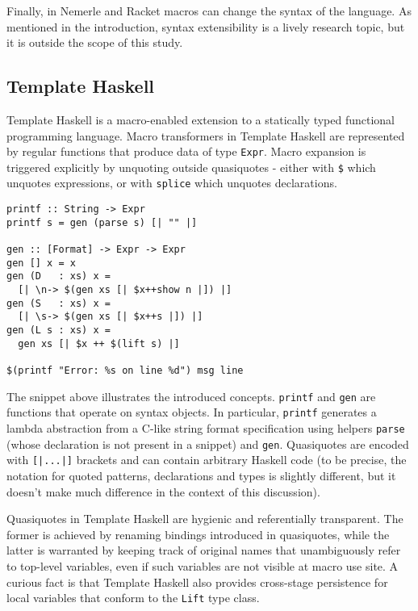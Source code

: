 \documentclass[10pt,journal,a4paper]{IEEEtran}
\begin{document}
Finally, in Nemerle and Racket macros can change the syntax of the language.
As mentioned in the introduction, syntax extensibility is a lively
research topic, but it is outside the scope of this study.

\subsection{Template Haskell}

Template Haskell is a macro-enabled extension to a statically typed functional programming language.
Macro transformers in Template Haskell are represented by regular functions that produce
data of type \small \texttt{Expr}\normalsize. Macro expansion is triggered explicitly by
unquoting outside quasiquotes - either with \small \texttt{\$} \normalsize which unquotes expressions,
or with \small \texttt{splice} \normalsize which unquotes declarations.

\small
\begin{verbatim}
printf :: String -> Expr
printf s = gen (parse s) [| "" |]

gen :: [Format] -> Expr -> Expr
gen [] x = x
gen (D   : xs) x =
  [| \n-> $(gen xs [| $x++show n |]) |]
gen (S   : xs) x =
  [| \s-> $(gen xs [| $x++s |]) |]
gen (L s : xs) x =
  gen xs [| $x ++ $(lift s) |]

$(printf "Error: %s on line %d") msg line
\end{verbatim}
\normalsize

The snippet above illustrates the introduced concepts. \small \texttt{printf} \normalsize and
\small \texttt{gen} \normalsize are functions that operate on syntax objects. In particular,
\small \texttt{printf} \normalsize generates a lambda abstraction from a C-like string format
specification using helpers \small \texttt{parse} \normalsize (whose declaration is
not present in a snippet) and \small \texttt{gen}\normalsize.
Quasiquotes are encoded with \small \texttt{[|...|]} \normalsize brackets and can contain arbitrary
Haskell code (to be precise, the notation for quoted patterns, declarations and types is slightly different,
but it doesn't make much difference in the context of this discussion).

Quasiquotes in Template Haskell are hygienic and referentially transparent. The former is achieved
by renaming bindings introduced in quasiquotes, while the latter is warranted by keeping track
of original names that unambiguously refer to top-level variables, even if such variables are not visible
at macro use site. A curious fact is that Template Haskell also provides cross-stage persistence for
local variables that conform to the \small \texttt{Lift} \normalsize type class.
\end{document}
